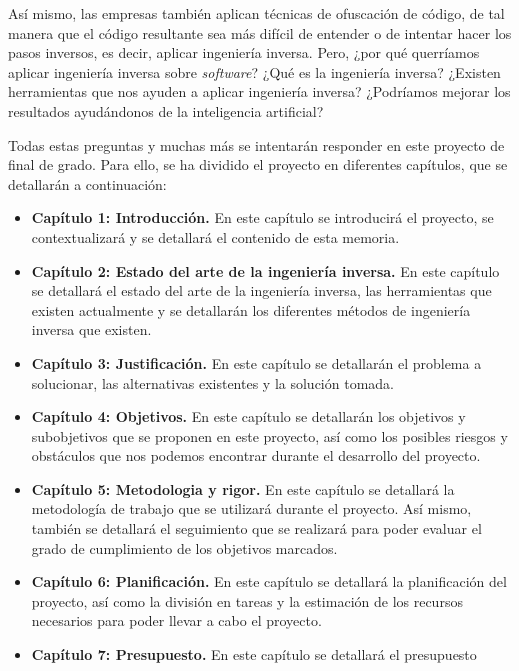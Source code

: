 Así mismo, las empresas también aplican técnicas de ofuscación de código, de tal
manera que el código resultante sea más difícil de entender o de intentar hacer los
pasos inversos, es decir, aplicar ingeniería inversa. Pero, ¿por qué querríamos
aplicar ingeniería inversa sobre \textit{software}? ¿Qué es la ingeniería inversa? ¿Existen
herramientas que nos ayuden a aplicar ingeniería inversa? ¿Podríamos mejorar los
resultados ayudándonos de la inteligencia artificial?

Todas estas preguntas y muchas más se intentarán responder en este proyecto de final
de grado. Para ello, se ha dividido el proyecto en diferentes capítulos, que se
detallarán a continuación:


\begin{itemize}
    \item \textbf{Capítulo 1: Introducción.} En este capítulo se introducirá el proyecto,
        se contextualizará y se detallará el contenido de esta memoria.
    \item \textbf{Capítulo 2: Estado del arte de la ingeniería inversa.} En este capítulo
        se detallará el estado del arte de la ingeniería inversa, las herramientas que
        existen actualmente y se detallarán los diferentes métodos de ingeniería inversa 
        que existen.
    \item \textbf{Capítulo 3: Justificación.} En este capítulo se detallarán el problema
        a solucionar, las alternativas existentes y la solución tomada.
    \item \textbf{Capítulo 4: Objetivos.} En este capítulo se detallarán los objetivos
        y subobjetivos que se proponen en este proyecto, así como los posibles riesgos
        y obstáculos que nos podemos encontrar durante el desarrollo del proyecto.
    \item \textbf{Capítulo 5: Metodologia y rigor.} En este capítulo se detallará la
        metodología de trabajo que se utilizará durante el proyecto. Así mismo, también
        se detallará el seguimiento que se realizará para poder evaluar el grado de
        cumplimiento de los objetivos marcados.
    \item \textbf{Capítulo 6: Planificación.} En este capítulo se detallará la planificación
        del proyecto, así como la división en tareas y la estimación de los recursos
        necesarios para poder llevar a cabo el proyecto.
    \item \textbf{Capítulo 7: Presupuesto.} En este capítulo se detallará el presupuesto

\end{itemize}
